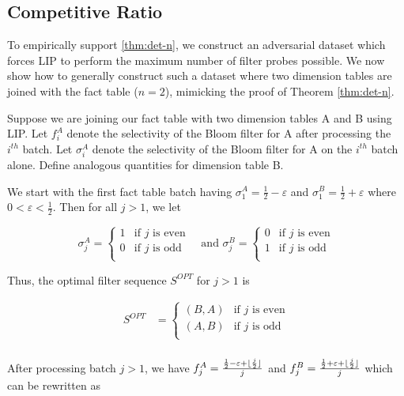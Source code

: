 \subsection{Competitive Ratio}
\label{sec:ratio}

To empirically support \ref{thm:det-n}, we construct an adversarial dataset which forces LIP to perform the maximum number of filter probes possible.
We now show how to generally construct such a dataset where two dimension tables are joined with the fact table ($n = 2$), mimicking the proof of Theorem \ref{thm:det-n}.

Suppose we are joining our fact table with two dimension tables A and B using LIP.
Let $f_i^A$ denote the selectivity of the Bloom filter for A after processing the $i^{th}$ batch. 
Let $\sigma_i^A$ denote the selectivity of the Bloom filter for A on the $i^{th}$ batch alone. 
Define analogous quantities for dimension table B.

We start with the first fact table batch having
$\sigma_1^A = \frac{1}{2} - \varepsilon$ and $\sigma_1^B = \frac{1}{2} + \varepsilon$ where $0 < \varepsilon < \frac{1}{2}$. Then for all $j > 1$, we let

\begin{equation*}
\sigma_j^A = 
    \begin{cases}
    1 & \text{if $j$ is even} \\[0.5em]
    0 & \text{if $j$ is odd} \\
    \end{cases} \quad \text{and }
\sigma_j^B = 
    \begin{cases}
    0 & \text{if $j$ is even} \\[0.5em]
    1 &  \text{if $j$ is odd} \\
    \end{cases}
\end{equation*}

Thus, the optimal filter sequence $S^{OPT}$ for $j > 1$ is 

\begin{align*}
S^{OPT} &= 
    \begin{cases}
    (B, A) & \text{if $j$ is even} \\[0.5em]
    (A, B) & \text{if $j$ is odd} \\
    \end{cases}\\[0.5em]
\end{align*}

\DeclarePairedDelimiter\floor{\lfloor}{\rfloor}
After processing batch $j > 1$, we have 
$f_j^A = \frac{\frac{1}{2} - \varepsilon + \floor{\frac{j}{2}}}{j}$ 
and 
$f_j^B = \frac{\frac{1}{2} + \varepsilon + \floor{\frac{j}{2}}}{j}$  
which can be rewritten as

